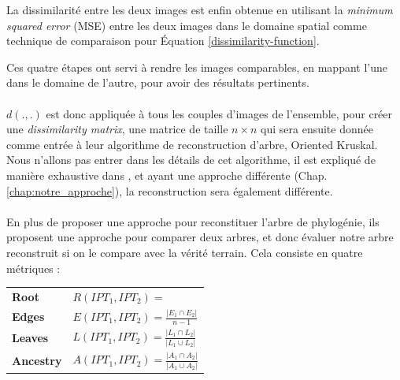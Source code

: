 \documentclass[utf8]{stageM2R} %
\begin{document}
La dissimilarité entre les deux images est enfin obtenue en utilisant la \textit{minimum squared error} (MSE) entre les deux images dans le domaine spatial comme technique de comparaison pour Équation \ref{dissimilarity-function}.

Ces quatre étapes ont servi à rendre les images comparables, en mappant l'une dans le domaine de l'autre, pour avoir des résultats pertinents.
\paragraph{}

$d(.,.)$ est donc appliquée à tous les couples d'images de l'ensemble, pour créer une \textit{dissimilarity matrix}, une matrice de taille $n\times n$ qui sera ensuite donnée comme entrée à leur algorithme de reconstruction d'arbre, Oriented Kruskal. Nous n'allons pas entrer dans les détails de cet algorithme, il est expliqué de manière exhaustive dans \cite{dias2012image}, et ayant une approche différente (Chap. \ref{chap:notre_approche}), la reconstruction sera également différente.
\paragraph{}                    

En plus de proposer une approche pour reconstituer l'arbre de phylogénie, ils proposent une approche pour comparer deux arbres, et donc évaluer notre arbre reconstruit si on le compare avec la vérité terrain. Cela consiste en quatre métriques : \\
\renewcommand{\arraystretch}{2}
\begin{tabular}{ll}
  \textbf{Root} & $
                  R(IPT_{1}, IPT_{2}) = $
                  \scalebox{0.65}{%
                  $
                  \begin{cases}
                    1 & if\ \texttt{Root(IPT}_{1}) = \texttt{Root(IPT}_{2}) \\
                    0 & Otherwise
                  \end{cases}
                        $} \\
  \textbf{Edges} & $E(IPT_{1}, IPT_{2}) = \frac{|E_{1} \cap E_{2}|} {n - 1}$ \\
  \textbf{Leaves} & $L(IPT_{1}, IPT_{2}) = \frac{|L_{1} \cap L_{2}|} {|L_{1} \cup L_{2}|}$ \\
  \textbf{Ancestry} & $A(IPT_{1}, IPT_{2}) = \frac{|A_{1} \cap A_{2}|} {|A_{1} \cup A_{2}|}$
\end{tabular}
\renewcommand{\arraystretch}{1.}
\end{document}
